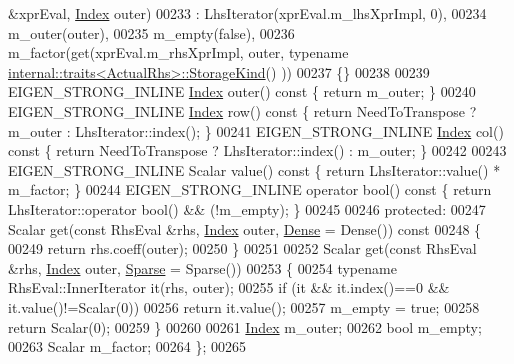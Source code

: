 \begin{DoxyCode}
       &xprEval, \hyperlink{namespace_eigen_a62e77e0933482dafde8fe197d9a2cfde}{Index} outer)
00233       : LhsIterator(xprEval.m\_lhsXprImpl, 0),
00234         m\_outer(outer),
00235         m\_empty(\textcolor{keyword}{false}),
00236         m\_factor(\textcolor{keyword}{get}(xprEval.m\_rhsXprImpl, outer, \textcolor{keyword}{typename} 
      \hyperlink{struct_eigen_1_1internal_1_1traits}{internal::traits<ActualRhs>::StorageKind}() ))
00237     \{\}
00238     
00239     EIGEN\_STRONG\_INLINE \hyperlink{namespace_eigen_a62e77e0933482dafde8fe197d9a2cfde}{Index} outer()\textcolor{keyword}{ const }\{ \textcolor{keywordflow}{return} m\_outer; \}
00240     EIGEN\_STRONG\_INLINE \hyperlink{namespace_eigen_a62e77e0933482dafde8fe197d9a2cfde}{Index} row()\textcolor{keyword}{   const }\{ \textcolor{keywordflow}{return} NeedToTranspose ? m\_outer : LhsIterator::index();
       \}
00241     EIGEN\_STRONG\_INLINE \hyperlink{namespace_eigen_a62e77e0933482dafde8fe197d9a2cfde}{Index} col()\textcolor{keyword}{   const }\{ \textcolor{keywordflow}{return} NeedToTranspose ? LhsIterator::index() : m\_outer;
       \}
00242 
00243     EIGEN\_STRONG\_INLINE Scalar value()\textcolor{keyword}{ const }\{ \textcolor{keywordflow}{return} LhsIterator::value() * m\_factor; \}
00244     EIGEN\_STRONG\_INLINE \textcolor{keyword}{operator} bool()\textcolor{keyword}{ const }\{ \textcolor{keywordflow}{return} LhsIterator::operator bool() && (!m\_empty); \}
00245     
00246   \textcolor{keyword}{protected}:
00247     Scalar \textcolor{keyword}{get}(\textcolor{keyword}{const} RhsEval &rhs, \hyperlink{namespace_eigen_a62e77e0933482dafde8fe197d9a2cfde}{Index} outer, \hyperlink{struct_eigen_1_1_dense}{Dense} = Dense()) \textcolor{keyword}{const}
00248     \{
00249       \textcolor{keywordflow}{return} rhs.coeff(outer);
00250     \}
00251     
00252     Scalar \textcolor{keyword}{get}(\textcolor{keyword}{const} RhsEval &rhs, \hyperlink{namespace_eigen_a62e77e0933482dafde8fe197d9a2cfde}{Index} outer, \hyperlink{struct_eigen_1_1_sparse}{Sparse} = Sparse())
00253     \{
00254       \textcolor{keyword}{typename} RhsEval::InnerIterator it(rhs, outer);
00255       \textcolor{keywordflow}{if} (it && it.index()==0 && it.value()!=Scalar(0))
00256         \textcolor{keywordflow}{return} it.value();
00257       m\_empty = \textcolor{keyword}{true};
00258       \textcolor{keywordflow}{return} Scalar(0);
00259     \}
00260     
00261     \hyperlink{namespace_eigen_a62e77e0933482dafde8fe197d9a2cfde}{Index} m\_outer;
00262     \textcolor{keywordtype}{bool} m\_empty;
00263     Scalar m\_factor;
00264   \};
00265   

\end{DoxyCode}
